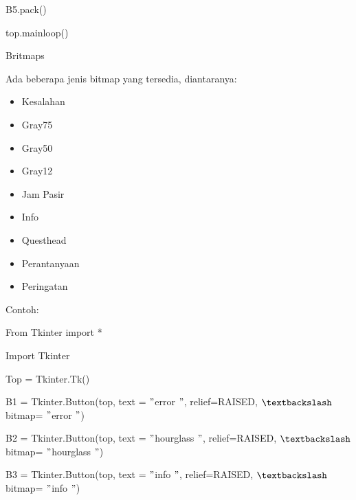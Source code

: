 \documentclass{wileySix}
\begin{document}
\begin{myEnumerate}
\begin{myEnumerate}
{\begin{myEnumerate}
	{\fontsize{10pt}{10pt}\selectfont B5.pack()} \par
	{\fontsize{10pt}{10pt}\selectfont top.mainloop()} \par
	\noindent 
	\item Britmaps \par
	\noindent 
	Ada beberapa jenis bitmap yang tersedia, diantaranya: \par
	\noindent 
	\begin{itemize}
		\item Kesalahan \par
		\noindent 
		\item Gray75 \par
		\noindent 
		\item Gray50 \par
		\noindent 
		\item Gray12 \par
		\noindent 
		\item Jam Pasir \par
		\noindent 
		\item Info \par
		\noindent 
		\item Questhead \par
		\noindent 
		\item Perantanyaan  \par
		\noindent 
		\item Peringatan\end{itemize}
	\par
	\vspace{12pt}
	Contoh: \par
	{\fontsize{10pt}{10pt}\selectfont From Tkinter import *} \par
	{\fontsize{10pt}{10pt}\selectfont Import Tkinter} \par
	\vspace{10pt}
	{\fontsize{10pt}{10pt}\selectfont Top = Tkinter.Tk()} \par
	\vspace{10pt}
	{\fontsize{10pt}{10pt}\selectfont B1 = Tkinter.Button(top, text = $ " $error $ " $, relief=RAISED,  $  \textbackslash  $ bitmap= $ " $error $ " $)} \par
	{\fontsize{10pt}{10pt}\selectfont B2 = Tkinter.Button(top, text = $ " $hourglass $ " $, relief=RAISED,  $  \textbackslash  $ bitmap= $ " $hourglass $ " $)} \par
	{\fontsize{10pt}{10pt}\selectfont B3 = Tkinter.Button(top, text = $ " $info $ " $, relief=RAISED,  $  \textbackslash  $ bitmap= $ " $info $ " $)} \par

\end{myEnumerate}}
\end{myEnumerate}
\end{myEnumerate}
\end{document}
